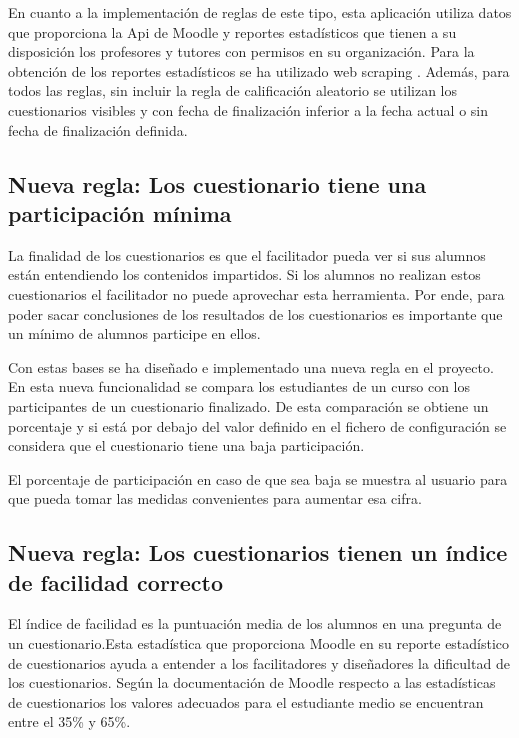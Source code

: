 En cuanto a la implementación de reglas de este tipo, esta aplicación utiliza datos que proporciona la Api de Moodle \cite{moodle-api} y reportes estadísticos \cite{estadisticas-examen} que tienen a su disposición los profesores y tutores con permisos en su organización. Para la obtención de los reportes estadísticos se ha utilizado web scraping \cite{web-scraping}. Además, para todos las reglas, sin incluir la regla de calificación aleatorio se utilizan los  cuestionarios visibles y con fecha de finalización inferior a la fecha actual o sin fecha de finalización definida. 

\subsection{Nueva regla: Los cuestionario tiene una participación mínima}
La finalidad de los cuestionarios es que el facilitador pueda ver si sus alumnos están entendiendo los contenidos impartidos. Si los alumnos no realizan estos cuestionarios el facilitador no puede aprovechar esta herramienta. Por ende, para poder sacar conclusiones de los resultados de los cuestionarios es importante que un mínimo de alumnos participe en ellos. 

Con estas bases se ha diseñado e implementado una nueva regla en el proyecto. En esta nueva funcionalidad se compara los estudiantes de un curso con los participantes de un cuestionario finalizado. De esta comparación se obtiene un porcentaje y si está por debajo del valor definido en el fichero de configuración se considera que el cuestionario tiene una baja participación.

El porcentaje de participación en caso de que sea baja se muestra al usuario para que pueda tomar las medidas convenientes para aumentar esa cifra.

\subsection{Nueva regla: Los cuestionarios tienen un índice de facilidad correcto}
El índice de facilidad es la puntuación media de los alumnos en una pregunta de un cuestionario.Esta estadística que proporciona Moodle en su reporte estadístico de cuestionarios ayuda a entender a los facilitadores y diseñadores la dificultad de los cuestionarios. Según la documentación de Moodle respecto a las estadísticas de cuestionarios \cite{estadisticas-examen} los valores adecuados para el estudiante medio se encuentran entre el 35\% y 65\%.


